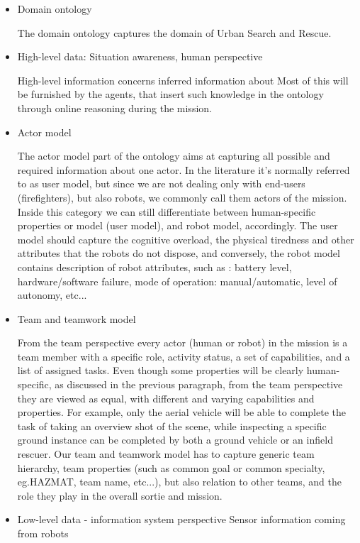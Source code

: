 \begin{itemize}
\item Domain ontology

The domain ontology captures the domain of Urban Search and Rescue.


\item High-level data: Situation awareness, human perspective

High-level information concerns inferred information about 
Most of this will be furnished by the agents, that insert such knowledge in the ontology through online reasoning during the mission. 

\item Actor model

The actor model part of the ontology aims at capturing all possible and required information about one actor. In the literature it's normally referred to as user model, but since we are not dealing only with end-users (firefighters), but also robots, we commonly call them actors of the mission. Inside this category we can still differentiate between human-specific properties or model (user model), and robot model, accordingly. The user model should capture the cognitive overload, the physical tiredness and other attributes that the robots do not dispose, and conversely, the robot model contains description of robot attributes, such as : battery level, hardware/software failure, mode of operation: manual/automatic, level of autonomy, etc... 

\item Team and teamwork model

From the team perspective every actor (human or robot) in the mission is a team member with a specific role, activity status, a set of capabilities, and a list of assigned tasks. Even though some properties will be clearly human-specific, as discussed in the previous paragraph, from the team perspective they are viewed as equal, with different and varying capabilities and properties. For example, only the aerial vehicle will be able to complete the task of taking an overview shot of the scene, while inspecting a specific ground instance can be completed by both a ground vehicle or an infield rescuer. Our team and teamwork model has to capture generic team hierarchy, team properties (such as common goal or common specialty, eg.HAZMAT, team name, etc...), but also relation to other teams, and the role they play in the overall sortie and mission.

\item Low-level data - information system perspective
Sensor information coming from robots

\end{itemize}



